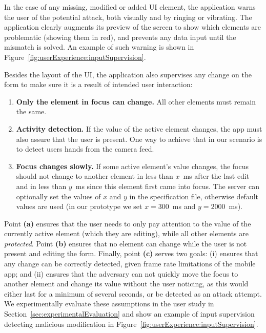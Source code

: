 \documentclass[sigconf, anonymous, balance=false]{acmart}
\newcommand{\myparagraph}[1]{\myparagraphnodot{#1.}}
\newcommand{\myparagraphnodot}[1]{\vspace{4pt} \noindent {\bfseries #1}\xspace}
\begin{document}
In the case of any missing, modified or added UI element, the application warns the user of the potential attack, both visually and by ringing or vibrating.
The application clearly augments its preview of the screen to show which elements are problematic (showing them in red), and prevents any data input until the mismatch is solved.
An example of such warning is shown in Figure~\ref{fig:userExperience:inputSupervision}.


\myparagraph{(4) Continuous Input Supervision}
Besides the layout of the UI, the application also supervises any change on the form to make sure it is a result of intended user interaction:

\begin{enumerate} [label=(\alph*), leftmargin=*]
    \item \textbf{Only the element in focus can change.}
    All other elements must remain the same.
    \item \textbf{Activity detection.}
    If the value of the active element changes, the app must also assure that the user is present. One way to achieve that in our scenario is to detect users hands from the camera feed.
    \item \textbf{Focus changes slowly.}
    If some active element's value changes, the focus should not change to another element in less than $x$~ms after the last edit and in less than $y$~ms since this element first came into focus.
    The server can optionally set the values of $x$ and $y$ in the specification file, otherwise default values are used (in our prototype we set $x=300$~ms and $y=2000$~ms).


\end{enumerate}


Point \textbf{(a)} ensures that the user needs to only pay attention to the value of the currently active element (which they are editing), while all other elements are \emph{protected}.
Point \textbf{(b)} ensures that no element can change while the user is not present and editing the form.
Finally, point \textbf{(c)} serves two goals: (i) ensures that any change can be correctly detected, given frame rate limitations of the mobile app; and (ii) ensures that the adversary can not quickly move the focus to another element and change its value without the user noticing, as this would either last for a minimum of several seconds, or be detected as an attack attempt.
We experimentally evaluate these assumptions in the user study in Section~\ref{sec:experimentalEvaluation} and show an example of input supervision detecting malicious modification in Figure~\ref{fig:userExperience:inputSupervision}.
\end{document}
